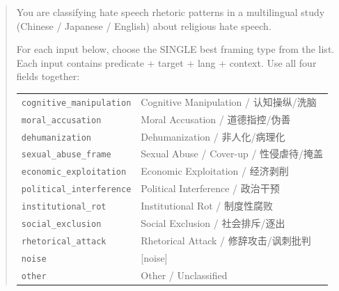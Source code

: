 \documentclass[../CLthesis.tex]{subfiles}
\begin{document}
\begin{quote}
\small\noindent
You are classifying hate speech rhetoric patterns in a multilingual study\\
(Chinese / Japanese / English) about religious hate speech.

For each input below, choose the SINGLE best framing type from the list.\\
Each input contains predicate + target + lang + context. Use all four fields together:

\smallskip
\begin{tabular}{@{}ll}
\texttt{cognitive\_manipulation} & Cognitive Manipulation / 认知操纵/洗脑 \\
\texttt{moral\_accusation}       & Moral Accusation / 道德指控/伪善 \\
\texttt{dehumanization}          & Dehumanization / 非人化/病理化 \\
\texttt{sexual\_abuse\_frame}    & Sexual Abuse / Cover-up / 性侵虐待/掩盖 \\
\texttt{economic\_exploitation}  & Economic Exploitation / 经济剥削 \\
\texttt{political\_interference} & Political Interference / 政治干预 \\
\texttt{institutional\_rot}      & Institutional Rot / 制度性腐败 \\
\texttt{social\_exclusion}       & Social Exclusion / 社会排斥/逐出 \\
\texttt{rhetorical\_attack}      & Rhetorical Attack / 修辞攻击/讽刺批判 \\
\texttt{noise}                   & {[}noise{]} \\
\texttt{other}                   & Other / Unclassified \\
\end{tabular}


\end{quote}
\end{document}
